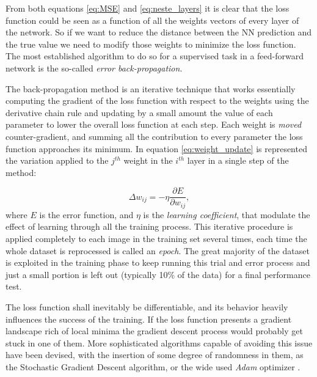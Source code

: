 From both equations \ref{eq:MSE} and \ref{eq:neste_layers} it is clear that the loss function could be seen as a function of all the weights vectors of every layer of the network. So if we want to reduce the distance between the NN prediction and the true value we need to modify those weights to minimize the loss function. The most established algorithm to do so for a supervised task in a feed-forward network is the so-called \textit{error back-propagation}.

The back-propagation method is an iterative technique that works essentially computing the gradient of the loss function with respect to the weights using the derivative chain rule and updating by a small amount the value of each parameter to lower the overall loss function at each step. Each weight is  \textit{moved} counter-gradient, and summing all the contribution to every parameter the loss function approaches its minimum. In equation \ref{eq:weight_update} is represented the variation applied to the $j^{th}$ weight in the $i^{th}$ layer in a single step of the method:

\begin{equation}
    \Delta w_{ij} = - \eta \frac{\partial E}{\partial w_{ij}},
    \label{eq:weight_update}
\end{equation}
where $E$ is the error function, and $\eta$ is the \textit{learning coefficient}, that modulate the effect of learning through all the training process. This iterative procedure is applied completely to each image in the training set several times, each time the whole dataset is reprocessed is called an \textit{epoch}. The great majority of the dataset is exploited in the training phase to keep running this trial and error process and just a small portion is left out (typically 10\% of the data) for a final performance test.

The loss function shall inevitably be differentiable, and its behavior heavily influences the success of the training. If the loss function presents a gradient landscape rich of local minima the gradient descent process would probably get stuck in one of them. More sophisticated algorithms capable of avoiding this issue have been devised, with the insertion of some degree of randomness in them, as the Stochastic Gradient Descent algorithm, or the wide used \textit{Adam} optimizer \cite{1412.6980}.

